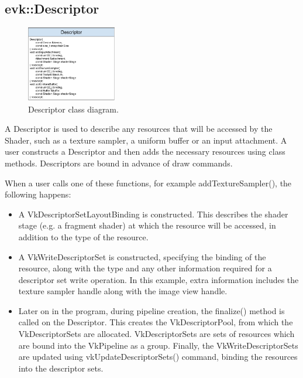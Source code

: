 \documentclass[12pt]{report}
\theoremstyle{definition}
\begin{document}
      \subsection{evk::Descriptor}

        \begin{figure}[h]
          \centering
          \includegraphics[width=0.35\textwidth]{images/class_descriptor.png}
          \caption{Descriptor class diagram.}
          \label{fig:class_descriptor}
        \end{figure}

        A Descriptor is used to describe any resources that will be accessed by
        the Shader, such as a texture sampler, a uniform buffer or an input
        attachment. A user constructs a Descriptor and then adds the necessary
        resources using class methods. Descriptors are bound in advance of draw
        commands.

        When a user calls one of these functions, for example
        addTextureSampler(), the following happens:

        \begin{itemize}
          \item A VkDescriptorSetLayoutBinding is constructed. This describes
            the shader stage (e.g. a fragment shader) at which the resource
            will be accessed, in addition to the type of the resource.
          \item A VkWriteDescriptorSet is constructed, specifying the binding
            of the resource, along with the type and any other information
            required for a descriptor set write operation. In this example,
            extra information includes the texture sampler handle along with
            the image view handle.
          \item Later on in the program, during pipeline creation, the
            finalize() method is called on the Descriptor. This creates the
            VkDescriptorPool, from which the VkDescriptorSets are allocated.
            VkDescriptorSets are sets of resources which are bound into the
            VkPipeline as a group. Finally, the VkWriteDescriptorSets are
            updated using vkUpdateDescriptorSets() command, binding the
            resources into the descriptor sets.
        \end{itemize}
\end{document}
